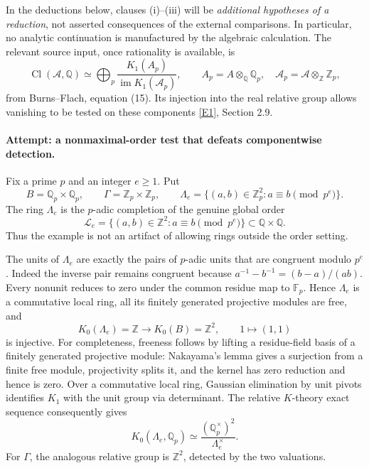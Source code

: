 \documentclass[11pt,a4paper]{article}
\newcommand{\Z}{\mathbb{Z}}
\newcommand{\Q}{\mathbb{Q}}
\newcommand{\F}{\mathbb{F}}
\newcommand{\eref}[2]{\hyperlink{extra:#1:#2}{[E#2]}}
\numberwithin{equation}{section}
\begin{document}
In the deductions below, clauses (i)--(iii) will be \emph{additional hypotheses of a reduction}, not asserted consequences of the external comparisons. In particular, no analytic continuation is manufactured by the algebraic calculation. The relevant source input, once rationality is available, is
\begin{equation}\label{r58:localization}
 \operatorname{Cl}(\mathcal A,\Q)
 \simeq\bigoplus_p
 \frac{K_1(A_p)}{\operatorname{im}K_1(\mathcal A_p)},
 \qquad A_p=A\otimes_{\Q}\Q_p,
 \quad\mathcal A_p=\mathcal A\otimes_{\Z}\Z_p,
\end{equation}
from Burns--Flach, equation (15). Its injection into the real relative group allows vanishing to be tested on these components \eref{statement}{1}, Section 2.9.

\paragraph{Attempt: a nonmaximal-order test that defeats componentwise detection.}
Fix a prime $p$ and an integer $e\geq1$. Put
\[
 B=\Q_p\times\Q_p,\qquad
 \Gamma=\Z_p\times\Z_p,\qquad
 \Lambda_e=\{(a,b)\in\Z_p^2:a\equiv b\pmod{p^e}\}.
\]
The ring $\Lambda_e$ is the $p$-adic completion of the genuine global order
\[
 \mathcal L_e=\{(a,b)\in\Z^2:a\equiv b\pmod{p^e}\}
                           \subset\Q\times\Q.
\]
Thus the example is not an artifact of allowing rings outside the order setting.

The units of $\Lambda_e$ are exactly the pairs of $p$-adic units that are congruent modulo $p^e$. Indeed the inverse pair remains congruent because
$a^{-1}-b^{-1}=(b-a)/(ab)$. Every nonunit reduces to zero under the common residue map to $\F_p$. Hence $\Lambda_e$ is a commutative local ring, all its finitely generated projective modules are free, and
\[
 K_0(\Lambda_e)=\Z\longrightarrow K_0(B)=\Z^2,
 \qquad 1\longmapsto(1,1)
\]
is injective. For completeness, freeness follows by lifting a residue-field basis of a finitely generated projective module: Nakayama's lemma gives a surjection from a finite free module, projectivity splits it, and the kernel has zero reduction and hence is zero. Over a commutative local ring, Gaussian elimination by unit pivots identifies $K_1$ with the unit group via determinant. The relative $K$-theory exact sequence consequently gives
\begin{equation}\label{r58:toyrelative}
 K_0(\Lambda_e,\Q_p)\simeq
       \frac{(\Q_p^\times)^2}{\Lambda_e^\times}.
\end{equation}
For $\Gamma$, the analogous relative group is $\Z^2$, detected by the two valuations.
\end{document}
